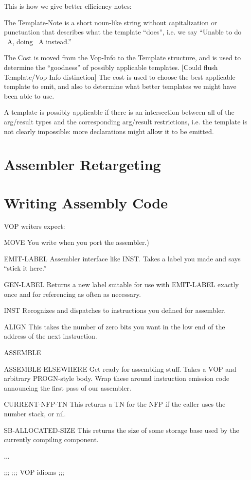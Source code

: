 This is how we give better efficiency notes:

The Template-Note is a short noun-like string without capitalization or
punctuation that describes what the template ``does'', i.e. we say
``Unable to do ~A, doing ~A instead.''

The Cost is moved from the Vop-Info to the Template structure, and is used to
determine the ``goodness'' of possibly applicable templates.  [Could flush
Template/Vop-Info distinction]  The cost is used to choose the best applicable
template to emit, and also to determine what better templates we might have
been able to use.

A template is possibly applicable if there is an intersection between all of
the arg/result types and the corresponding arg/result restrictions, i.e. the
template is not clearly impossible: more declarations might allow it to be
emitted.


\chapter{Assembler Retargeting}


\chapter{Writing Assembly Code}

VOP writers expect:
\begin{Lentry}
\item[MOVE]
      You write when you port the assembler.)
\item[EMIT-LABEL]
      Assembler interface like INST.  Takes a label you made and says ``stick it
      here.''
   \item[GEN-LABEL]
      Returns a new label suitable for use with EMIT-LABEL exactly once and
      for referencing as often as necessary.
   \item[INST]
      Recognizes and dispatches to instructions you defined for assembler.
   \item[ALIGN]
      This takes the number of zero bits you want in the low end of the address
      of the next instruction.
   \item[ASSEMBLE]
   \item[ASSEMBLE-ELSEWHERE]
      Get ready for assembling stuff.  Takes a VOP and arbitrary PROGN-style
      body.  Wrap these around instruction emission code announcing the first
      pass of our assembler.
   \item[CURRENT-NFP-TN]
      This returns a TN for the NFP if the caller uses the number stack, or
      nil.
   \item[SB-ALLOCATED-SIZE]
      This returns the size of some storage base used by the currently
      compiling component.
   \item[...]
\end{Lentry}
;;;
;;; VOP idioms
;;;

